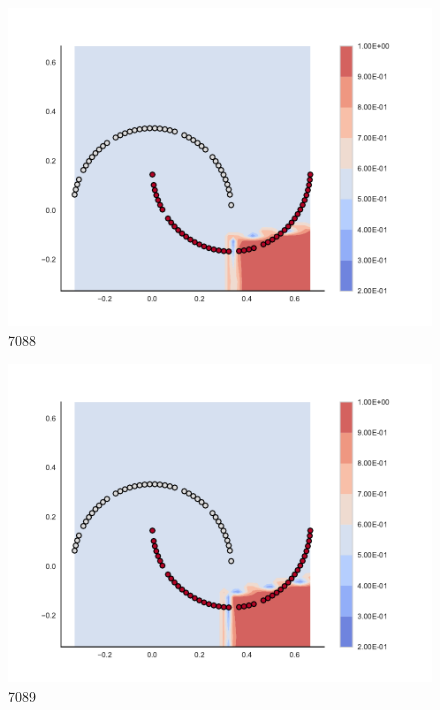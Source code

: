 \begin{subfigure}[b]{0.09\textwidth}
    \includegraphics[clip, trim=2.35cm 1.75cm 4.5cm 0cm,width=\textwidth]{img/convergence/7088.pdf}
    \caption{7088}
    \label{fig:convergence_7088}
\end{subfigure}
%
\begin{subfigure}[b]{0.09\textwidth}
    \includegraphics[clip, trim=2.35cm 1.75cm 4.5cm 0cm,width=\textwidth]{img/convergence/7089.pdf}
    \caption{7089}
    \label{fig:convergence_7089}
\end{subfigure}
%
